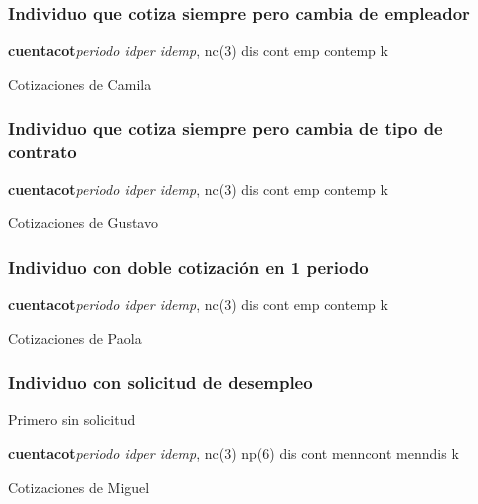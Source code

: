 \documentclass[8pt]{beamer}
\begin{document}
\begin{frame}[fragile, label=caso3]
\frametitle{Individuo que cotiza siempre pero cambia de empleador}

\begin{semiverbatim}
{\bf cuentacot}{\it periodo idper idemp}, nc({\color{blue}3}) {\color{blue}dis cont emp contemp k}
\end{semiverbatim}
\pause
\begin{table}
\caption{Cotizaciones de Camila}
\scalebox{.6}{

}
\end{table}
\hyperlink{escenarios}{}
\end{frame}

\begin{frame}[fragile, label=caso4]
\frametitle{Individuo que cotiza siempre pero cambia de tipo de contrato}

\begin{semiverbatim}
{\bf cuentacot}{\it periodo idper idemp}, nc({\color{blue}3}) {\color{blue}dis cont emp contemp k}
\end{semiverbatim}
\pause
\begin{table}
\caption{Cotizaciones de Gustavo}
\scalebox{.6}{

}
\end{table}
\hyperlink{escenarios}{}
\end{frame}

\begin{frame}[fragile, label=caso5]
\frametitle{Individuo con doble cotización en 1 periodo}

\begin{semiverbatim}
{\bf cuentacot}{\it periodo idper idemp}, nc({\color{blue}3}) {\color{blue}dis cont emp contemp k}
\end{semiverbatim}
\pause
\begin{table}
\caption{Cotizaciones de Paola}
\scalebox{.6}{

}
\end{table}
\hyperlink{escenarios}{}
\end{frame}

\begin{frame}[fragile, label=caso6]
\frametitle{Individuo con solicitud de desempleo}

Primero sin solicitud

\begin{semiverbatim}
{\bf cuentacot}{\it periodo idper idemp}, nc({\color{blue}3}) np({\color{blue}6}) {\color{blue}dis cont menncont menndis k}
\end{semiverbatim}
\pause
\begin{table}
\caption{Cotizaciones de Miguel}
\scalebox{.6}{

}
\end{table}
\hyperlink{escenarios}{}
\end{frame}
\end{document}

